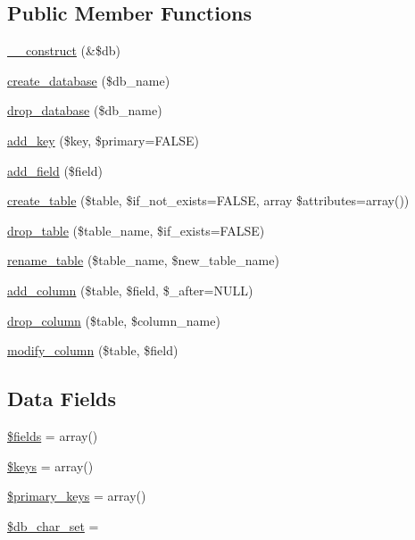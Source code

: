 \subsection*{Public Member Functions}
\begin{DoxyCompactItemize}
\item 
\hyperlink{class_c_i___d_b__forge_aaf2ef772755ec6f361d44e16cc9ffd69}{\+\_\+\+\_\+construct} (\&\$db)
\item 
\hyperlink{class_c_i___d_b__forge_a902a7267babceb2ce595706f217e00ad}{create\+\_\+database} (\$db\+\_\+name)
\item 
\hyperlink{class_c_i___d_b__forge_a9612987b2d4230de2638d15857e92e67}{drop\+\_\+database} (\$db\+\_\+name)
\item 
\hyperlink{class_c_i___d_b__forge_a70e5c5fca213d8ad84cc71ba1698c3dd}{add\+\_\+key} (\$key, \$primary=F\+A\+L\+S\+E)
\item 
\hyperlink{class_c_i___d_b__forge_acdaeff5aae80d6128c7ed9817ee82f1c}{add\+\_\+field} (\$field)
\item 
\hyperlink{class_c_i___d_b__forge_a0904375ba759fbe7961b424a46c0adae}{create\+\_\+table} (\$table, \$if\+\_\+not\+\_\+exists=F\+A\+L\+S\+E, array \$attributes=array())
\item 
\hyperlink{class_c_i___d_b__forge_ac46bdab43413dcc115d1be4a05dbcd0f}{drop\+\_\+table} (\$table\+\_\+name, \$if\+\_\+exists=F\+A\+L\+S\+E)
\item 
\hyperlink{class_c_i___d_b__forge_a0fb4802acad335ebdecd921d59de9a51}{rename\+\_\+table} (\$table\+\_\+name, \$new\+\_\+table\+\_\+name)
\item 
\hyperlink{class_c_i___d_b__forge_a855261dcf98c0cf401aa469994919c51}{add\+\_\+column} (\$table, \$field, \$\+\_\+after=N\+U\+L\+L)
\item 
\hyperlink{class_c_i___d_b__forge_aed0d6a0b12511dbdf19bb68fed7fd467}{drop\+\_\+column} (\$table, \$column\+\_\+name)
\item 
\hyperlink{class_c_i___d_b__forge_aa03cc8de0ac9ce03016bd2b50ddeff87}{modify\+\_\+column} (\$table, \$field)
\end{DoxyCompactItemize}
\subsection*{Data Fields}
\begin{DoxyCompactItemize}
\item 
\hyperlink{class_c_i___d_b__forge_ab2303c817e3b402b77b7f99627b9c319}{\$fields} = array()
\item 
\hyperlink{class_c_i___d_b__forge_af20635b6c08e03bfee9e3fc036fa80f3}{\$keys} = array()
\item 
\hyperlink{class_c_i___d_b__forge_a09349689030ba7198a094abf357c78bc}{\$primary\+\_\+keys} = array()
\item 
\hyperlink{class_c_i___d_b__forge_a6e90c3633cd0984a7e8de501f7771c53}{\$db\+\_\+char\+\_\+set} = \textquotesingle{}\textquotesingle{}
\end{DoxyCompactItemize}
